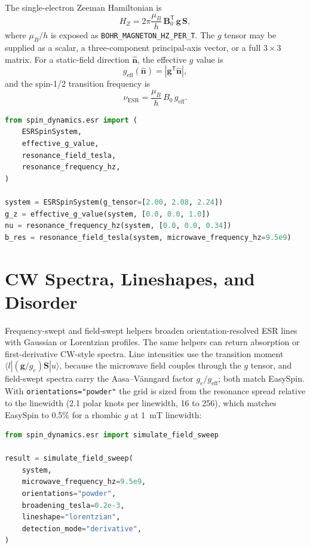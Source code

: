 \documentclass[11pt,oneside]{report}
\newcommand{\code}[1]{\texttt{#1}}
\begin{document}
The single-electron Zeeman Hamiltonian is
\[
  H_Z =
    2\pi \frac{\mu_B}{h}\,
    \mathbf{B}_0^{\mathsf{T}}\, \mathbf{g}\, \mathbf{S},
\]
where \(\mu_B/h\) is exposed as \code{BOHR\_MAGNETON\_HZ\_PER\_T}. The \(g\)
tensor may be supplied as a scalar, a three-component principal-axis vector, or
a full \(3\times 3\) matrix. For a static-field direction \(\hat{\mathbf{n}}\),
the effective \(g\) value is
\[
  g_{\mathrm{eff}}(\hat{\mathbf{n}})
    = \left|\mathbf{g}^{\mathsf{T}}\hat{\mathbf{n}}\right|,
\]
and the spin-1/2 transition frequency is
\[
  \nu_{\mathrm{ESR}} =
    \frac{\mu_B}{h}\,B_0\,g_{\mathrm{eff}} .
\]

\begin{lstlisting}[language=Python]
from spin_dynamics.esr import (
    ESRSpinSystem,
    effective_g_value,
    resonance_field_tesla,
    resonance_frequency_hz,
)

system = ESRSpinSystem(g_tensor=[2.00, 2.08, 2.24])
g_z = effective_g_value(system, [0.0, 0.0, 1.0])
nu = resonance_frequency_hz(system, [0.0, 0.0, 0.34])
b_res = resonance_field_tesla(system, microwave_frequency_hz=9.5e9)
\end{lstlisting}

\section{CW Spectra, Lineshapes, and Disorder}

Frequency-swept and field-swept helpers broaden orientation-resolved ESR lines
with Gaussian or Lorentzian profiles. The same helpers can return absorption
or first-derivative CW-style spectra. Line intensities use the transition
moment \(\langle l|(\mathbf{g}/g_e)\mathbf{S}|u\rangle\), because the microwave
field couples through the \(g\) tensor, and field-swept spectra carry the
Aasa--V\"anngard factor \(g_e/g_{\text{eff}}\); both match EasySpin. With
\code{orientations="powder"} the grid is sized from the resonance spread
relative to the linewidth (2.1 polar knots per linewidth, 16 to 256), which
matches EasySpin to 0.5\% for a rhombic \(g\) at 1~mT linewidth:

\begin{lstlisting}[language=Python]
from spin_dynamics.esr import simulate_field_sweep

result = simulate_field_sweep(
    system,
    microwave_frequency_hz=9.5e9,
    orientations="powder",
    broadening_tesla=0.2e-3,
    lineshape="lorentzian",
    detection_mode="derivative",
)
\end{lstlisting}
\end{document}
